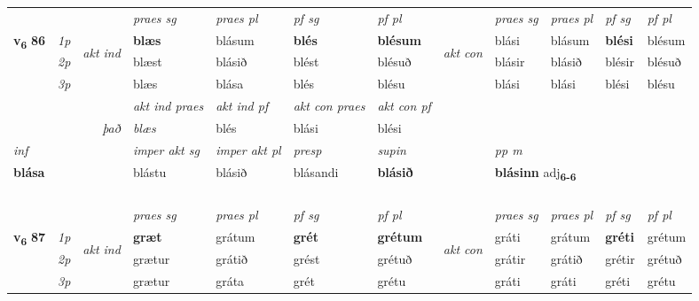 \begin{longtable}[l]{X>{\footnotesize\itshape}llXXXXlXXXX}
 & &   & \textit{praes sg}  & \textit{praes pl}    & \textit{ pf sg} & \textit{pf pl} & & \textit{praes sg}  & \textit{praes pl}    & \textit{pf sg} & \textit{pf pl }  \\ \cmidrule{4-7} \cmidrule{9-12}
 \multirow{2}{*}{{{\textbf{v{\textsubscript{6}}} \Large{\textbf{86}}}}}  & 1p & \multirow{3}{*}{\begin{turn}{90}\textit{akt ind}\end{turn}} & \textbf{blæs} & blásum & \textbf{blés} & \textbf{blésum} & \multirow{3}{*}{\begin{turn}{90}\textit{akt con}\end{turn}} &blási & blásum & \textbf{blési} & blésum\\*
 & 2p &  &  blæst  & blásið & blést & blésuð & & blásir & blásið & blésir & blésuð \\*
 & 3p &  & blæs & blása & blés & blésu & & blási & blási& blési & blésu \\*
\cmidrule{4-7} \cmidrule{9-12}

   && &  \textit{akt ind praes} & \textit{akt ind pf} & \textit{akt con praes} & \textit{akt con pf} \\*
\multicolumn{3}{r}{\textit{það}} & blæs & blés & blási & blési \\*

\cmidrule{4-7}
   {\textit{inf}} & &  & \textit{imper akt sg} & \textit{imper akt pl}   & \textit{presp} & \textit{supin}  && \textit{pp m} \\*
  {\textbf{blása}} & && blástu  & blásið   & blásandi &  \textbf{blásið}  && \multicolumn{2}{l}{\textbf{blásinn} adj\textbf{\textsubscript{6-6}}} \\*

\midrule
  & \\*
    & \\*
   & \\*
  & \\
   \midrule
 & &   & \textit{praes sg}  & \textit{praes pl}    & \textit{ pf sg} & \textit{pf pl} & & \textit{praes sg}  & \textit{praes pl}    & \textit{pf sg} & \textit{pf pl }  \\ \cmidrule{4-7} \cmidrule{9-12}
 \multirow{2}{*}{{{\textbf{v{\textsubscript{6}}} \Large{\textbf{87}}}}}  & 1p & \multirow{3}{*}{\begin{turn}{90}\textit{akt ind}\end{turn}} & \textbf{græt} & grátum & \textbf{grét} & \textbf{grétum} & \multirow{3}{*}{\begin{turn}{90}\textit{akt con}\end{turn}} &gráti & grátum & \textbf{gréti} & grétum\\*
 & 2p &  &  grætur  & grátið & grést & grétuð & & grátir & grátið & grétir & grétuð \\*
 & 3p &  & grætur & gráta & grét & grétu & & gráti & gráti& gréti & grétu \\*
\cmidrule{4-7} \cmidrule{9-12}


\end{longtable}
